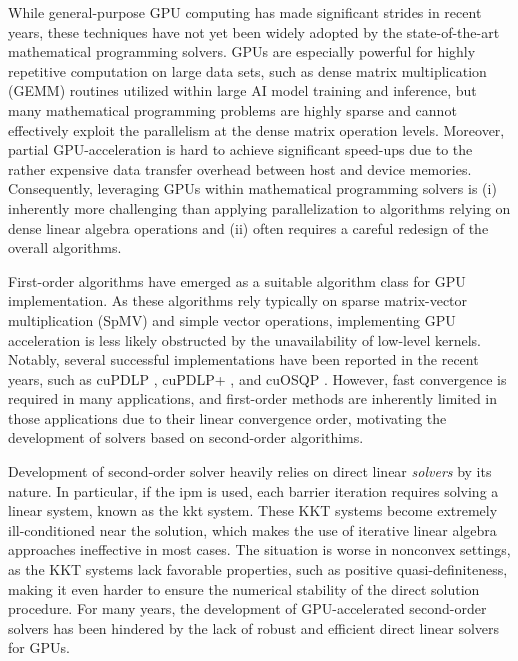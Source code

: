 \documentclass{article}
\begin{document}
While general-purpose GPU computing has made significant strides in recent years, these techniques have not yet been widely adopted by the state-of-the-art mathematical programming solvers.
GPUs are especially powerful for highly repetitive computation on large data sets, such as dense matrix multiplication (GEMM) routines utilized within large AI model training and inference, but many mathematical programming problems are highly sparse and cannot effectively exploit the parallelism at the dense matrix operation levels.
Moreover, partial GPU-acceleration is hard to achieve significant speed-ups due to the rather expensive data transfer overhead between host and device memories.
Consequently, leveraging GPUs within mathematical programming solvers is (i) inherently more challenging than applying parallelization to algorithms relying on dense linear algebra operations and (ii) often requires a careful redesign of the overall algorithms.


First-order algorithms have emerged as a suitable algorithm class for GPU implementation.
As these algorithms rely typically on sparse matrix-vector multiplication (SpMV) and simple vector operations, implementing GPU acceleration is less likely obstructed by the unavailability of low-level kernels.
Notably, several successful implementations have been reported in the recent years, such as cuPDLP \cite{}, cuPDLP+ \cite{}, and cuOSQP \cite{}.
However, fast convergence is required in many applications, and first-order methods are inherently limited in those applications due to their linear convergence order, motivating the development of solvers based on second-order algorithims.

Development of second-order solver heavily relies on direct linear \emph{solvers} by its nature.
In particular, if the \gls*{ipm} is used, each barrier iteration requires solving a linear system, known as the \gls{kkt} system.
These KKT systems become extremely ill-conditioned near the solution, which makes the use of iterative linear algebra approaches ineffective in most cases.
The situation is worse in nonconvex settings, as the KKT systems lack favorable properties, such as positive quasi-definiteness, making it even harder to ensure the numerical stability of the direct solution procedure.
For many years, the development of GPU-accelerated second-order solvers has been hindered by the lack of robust and efficient direct linear solvers for GPUs.
\end{document}
